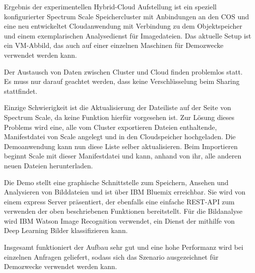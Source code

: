 Ergebnis der experimentellen Hybrid-Cloud Aufstellung ist ein speziell konfigurierter Spectrum Scale Speichercluster mit Anbindungen an den \ac{COS} und eine neu entwickeltet Cloudanwendung mit Verbindung zu dem Objektspeicher und einem exemplarischen Analysedienst für Imagedateien.
Das aktuelle Setup ist ein VM-Abbild, das auch auf einer einzelnen Maschinen für Demozwecke verwendet werden kann.

Der Austausch von Daten zwischen Cluster und Cloud finden problemlos statt. Es muss nur darauf geachtet werden, dass keine Verschlüsselung beim Sharing stattfindet.

Einzige Schwierigkeit ist die Aktualisierung der Dateiliste auf der Seite von Spectrum Scale, da keine Funktion hierfür vorgesehen ist. Zur Lösung dieses Problems wird eine, alle vom Cluster exportieren Dateien enthaltende, Manifestdatei von Scale angelegt und in den Cloudspeicher hochgeladen. Die Demoanwendung kann nun diese Liste selber aktualisieren. Beim Importieren beginnt Scale mit dieser Manifestdatei und kann, anhand von ihr, alle anderen neuen Dateien herunterladen.

Die Demo stellt eine graphische Schnittstelle zum Speichern, Ansehen und Analysieren von Bilddateien und ist über IBM Bluemix erreichbar. Sie wird von einem express Server präsentiert, der ebenfalls eine einfache REST-API zum verwenden der oben beschriebenen Funktionen bereitstellt. Für die Bildanalyse wird IBM Watson Image Recognition verwendet, ein Dienst der mithilfe von Deep Learning Bilder klassifizieren kann.

Insgesamt funktioniert der Aufbau sehr gut und eine hohe Performanz wird bei einzelnen Anfragen geliefert, sodass sich das Szenario ausgezeichnet für Demozwecke verwendet werden kann.